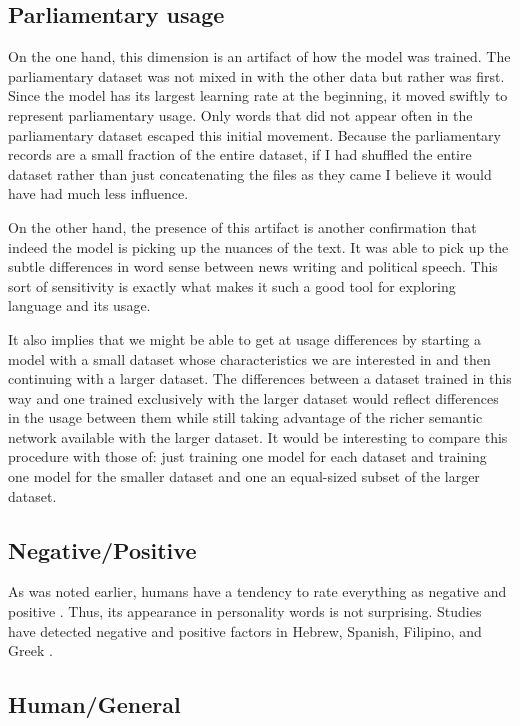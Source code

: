 \subsection{Parliamentary usage}

On the one hand, this dimension is an artifact of how the model was trained.
The parliamentary dataset was not mixed in with the other data but rather was
first. Since the model has its largest learning rate at the beginning, it moved
swiftly to represent parliamentary usage. Only words that did not appear often
in the parliamentary dataset escaped this initial movement. Because the 
parliamentary records are a small fraction of the entire dataset, if I had 
shuffled the entire dataset rather than just concatenating the files as they 
came I believe it would have had much less influence.

On the other hand, the presence of this artifact is another confirmation that
indeed the model is picking up the nuances of the text. It was able to pick up
the subtle differences in word sense between news writing and political speech.
This sort of sensitivity is exactly what makes it such a good tool for exploring
language and its usage.

It also implies that we might be able to get at usage differences by starting a
model with a small dataset whose characteristics we are interested in and then
continuing with a larger dataset. The differences between a dataset trained in
this way and one trained exclusively with the larger dataset would reflect 
differences in the usage between them while still taking advantage of the richer
semantic network available with the larger dataset. It would be interesting to
compare this procedure with those of: just training one model for each dataset
and training one model for the smaller dataset and one an equal-sized subset of
the larger dataset.

\subsection{Negative/Positive}

As was noted earlier, humans have a tendency to rate everything as negative and
positive \citep{Samsonovich2010}. Thus, its appearance in personality words
is not surprising. Studies have detected negative and positive factors
in Hebrew, Spanish, Filipino, and Greek \citep[p. 134]{DeRaad2009}. 

\subsection{Human/General}

